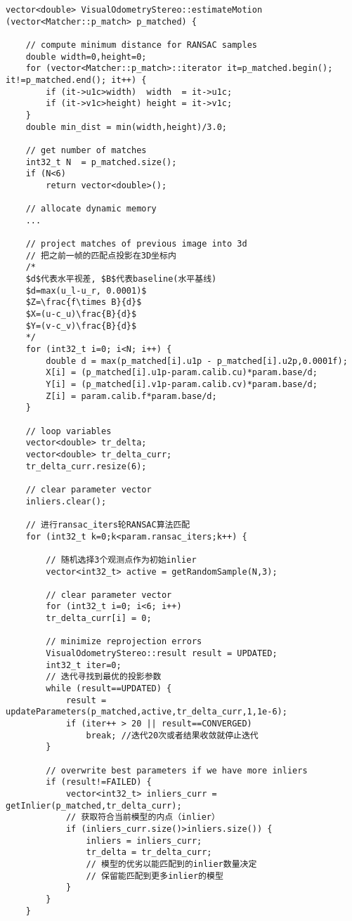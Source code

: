 \documentclass[UTF8]{ctexart}
\begin{document}
    \begin{verbatim}
vector<double> VisualOdometryStereo::estimateMotion (vector<Matcher::p_match> p_matched) {

    // compute minimum distance for RANSAC samples
    double width=0,height=0;
    for (vector<Matcher::p_match>::iterator it=p_matched.begin(); it!=p_matched.end(); it++) {
        if (it->u1c>width)  width  = it->u1c;
        if (it->v1c>height) height = it->v1c;
    }
    double min_dist = min(width,height)/3.0;
    
    // get number of matches
    int32_t N  = p_matched.size();
    if (N<6)
        return vector<double>();

    // allocate dynamic memory
    ...

    // project matches of previous image into 3d
    // 把之前一帧的匹配点投影在3D坐标内
    /* 
    $d$代表水平视差, $B$代表baseline(水平基线)
    $d=max(u_l-u_r, 0.0001)$
    $Z=\frac{f\times B}{d}$
    $X=(u-c_u)\frac{B}{d}$
    $Y=(v-c_v)\frac{B}{d}$
    */
    for (int32_t i=0; i<N; i++) {
        double d = max(p_matched[i].u1p - p_matched[i].u2p,0.0001f);
        X[i] = (p_matched[i].u1p-param.calib.cu)*param.base/d;
        Y[i] = (p_matched[i].v1p-param.calib.cv)*param.base/d;
        Z[i] = param.calib.f*param.base/d;
    }

    // loop variables
    vector<double> tr_delta;
    vector<double> tr_delta_curr;
    tr_delta_curr.resize(6);
    
    // clear parameter vector
    inliers.clear();

    // 进行ransac_iters轮RANSAC算法匹配
    for (int32_t k=0;k<param.ransac_iters;k++) {

        // 随机选择3个观测点作为初始inlier
        vector<int32_t> active = getRandomSample(N,3);

        // clear parameter vector
        for (int32_t i=0; i<6; i++)
        tr_delta_curr[i] = 0;

        // minimize reprojection errors
        VisualOdometryStereo::result result = UPDATED;
        int32_t iter=0;
        // 迭代寻找到最优的投影参数
        while (result==UPDATED) {
            result = updateParameters(p_matched,active,tr_delta_curr,1,1e-6);
            if (iter++ > 20 || result==CONVERGED)
                break; //迭代20次或者结果收敛就停止迭代
        }

        // overwrite best parameters if we have more inliers
        if (result!=FAILED) {
            vector<int32_t> inliers_curr = getInlier(p_matched,tr_delta_curr);
            // 获取符合当前模型的内点（inlier）
            if (inliers_curr.size()>inliers.size()) {
                inliers = inliers_curr;
                tr_delta = tr_delta_curr;
                // 模型的优劣以能匹配到的inlier数量决定
                // 保留能匹配到更多inlier的模型
            }
        }
    }
    

\end{verbatim}
\end{document}
